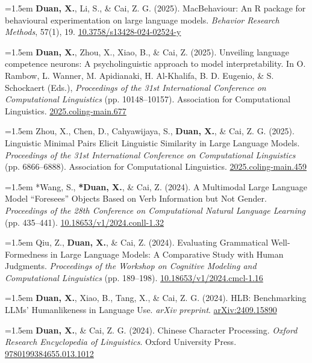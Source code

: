 \documentclass[11pt,a4paper]{article}
\begin{document}
\hangindent=1.5em  \textbf{Duan, X.}, Li, S., \& Cai, Z. G. (2025). MacBehaviour: An R package for behavioural experimentation on large language models. \textit{Behavior Research Methods}, 57(1), 19. \href{https://doi.org/10.3758/s13428-024-02524-y}{10.3758/s13428-024-02524-y}

\hangindent=1.5em  \textbf{Duan, X.}, Zhou, X., Xiao, B., \& Cai, Z. (2025). Unveiling language competence neurons: A psycholinguistic approach to model interpretability. In O. Rambow, L. Wanner, M. Apidianaki, H. Al-Khalifa, B. D. Eugenio, \& S. Schockaert (Eds.), \textit{Proceedings of the 31st International Conference on Computational Linguistics} (pp. 10148–10157). Association for Computational Linguistics. \href{https://aclanthology.org/2025.coling-main.677/}{2025.coling-main.677}

\hangindent=1.5em  Zhou, X., Chen, D., Cahyawijaya, S., \textbf{Duan, X.}, \& Cai, Z. G. (2025). Linguistic Minimal Pairs Elicit Linguistic Similarity in Large Language Models. \textit{Proceedings of the 31st International Conference on Computational Linguistics} (pp. 6866–6888). Association for Computational Linguistics. \href{https://aclanthology.org/2025.coling-main.459/}{2025.coling-main.459}

\hangindent=1.5em  *Wang, S., \textbf{*Duan, X.}, \& Cai, Z. (2024). A Multimodal Large Language Model “Foresees” Objects Based on Verb Information but Not Gender. \textit{Proceedings of the 28th Conference on Computational Natural Language Learning} (pp. 435–441). \href{https://doi.org/10.18653/v1/2024.conll-1.32}{10.18653/v1/2024.conll-1.32}

\hangindent=1.5em  Qiu, Z., \textbf{Duan, X.}, \& Cai, Z. (2024). Evaluating Grammatical Well-Formedness in Large Language Models: A Comparative Study with Human Judgments. \textit{Proceedings of the Workshop on Cognitive Modeling and Computational Linguistics} (pp. 189–198). \href{https://doi.org/10.18653/v1/2024.cmcl-1.16}{10.18653/v1/2024.cmcl-1.16}

\hangindent=1.5em  \textbf{Duan, X.}, Xiao, B., Tang, X., \& Cai, Z. G. (2024). HLB: Benchmarking LLMs' Humanlikeness in Language Use. \textit{arXiv preprint}. \href{https://arxiv.org/abs/2409.15890}{arXiv:2409.15890}

\hangindent=1.5em  \textbf{Duan, X.}, \& Cai, Z. G. (2024). Chinese Character Processing. \textit{Oxford Research Encyclopedia of Linguistics}. Oxford University Press. \href{https://doi.org/10.1093/acrefore/9780199384655.013.1012}{9780199384655.013.1012}
\end{document}
